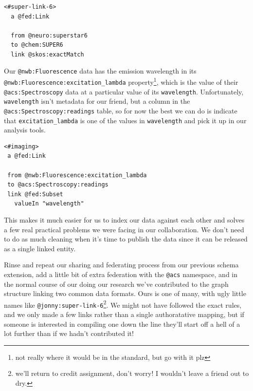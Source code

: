 \documentclass[10pt]{article}
\begin{document}
\begin{multicols}{2}
\begin{verbatim}
<#super-link-6>
  a @fed:Link
  
  from @neuro:superstar6
  to @chem:SUPER6
  link @skos:exactMatch
\end{verbatim}

Our \texttt{@nwb:Fluorescence} data has the emission wavelength in its
\texttt{@nwb:Fluorescence:excitation\_lambda} property\footnote{not
  really where it would be in the standard, but go with it plz}, which
is the value of their \texttt{@acs:Spectroscopy} data at a particular
value of its \texttt{wavelength}. Unfortunately, \texttt{wavelength}
isn't metadata for our friend, but a column in the
\texttt{@acs:Spectroscopy:readings} table, so for now the best we can do
is indicate that \texttt{excitation\_lambda} is one of the values in
\texttt{wavelength} and pick it up in our analysis tools.

\begin{verbatim}
<#imaging>
 a @fed:Link
 
 from @nwb:Fluorescence:excitation_lambda
 to @acs:Spectroscopy:readings
 link @fed:Subset
   valueIn "wavelength"
\end{verbatim}

This makes it much easier for us to index our data against each other
and solves a few real practical problems we were facing in our
collaboration. We don't need to do as much cleaning when it's time to
publish the data since it can be released as a single linked entity.

Rinse and repeat our sharing and federating process from our previous
schema extension, add a little bit of extra federation with the
\texttt{@acs} namespace, and in the normal course of our doing our
research we've contributed to the graph structure linking two common
data formats. Ours is one of many, with ugly little names like
\texttt{@jonny:super-link-6}\footnote{we'll return to credit assignment,
  don't worry! I wouldn't leave a friend out to dry.}. We might not have
followed the exact rules, and we only made a few links rather than a
single authoratative mapping, but if someone is interested in compiling
one down the line they'll start off a hell of a lot further than if we
hadn't contributed it!


\end{multicols}
\end{document}
